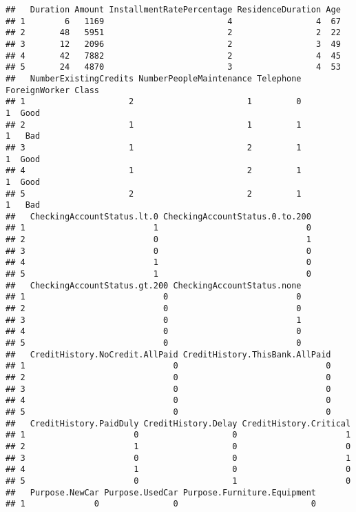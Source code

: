 \documentclass[
]{book}
\begin{document}
\begin{verbatim}
##   Duration Amount InstallmentRatePercentage ResidenceDuration Age
## 1        6   1169                         4                 4  67
## 2       48   5951                         2                 2  22
## 3       12   2096                         2                 3  49
## 4       42   7882                         2                 4  45
## 5       24   4870                         3                 4  53
##   NumberExistingCredits NumberPeopleMaintenance Telephone ForeignWorker Class
## 1                     2                       1         0             1  Good
## 2                     1                       1         1             1   Bad
## 3                     1                       2         1             1  Good
## 4                     1                       2         1             1  Good
## 5                     2                       2         1             1   Bad
##   CheckingAccountStatus.lt.0 CheckingAccountStatus.0.to.200
## 1                          1                              0
## 2                          0                              1
## 3                          0                              0
## 4                          1                              0
## 5                          1                              0
##   CheckingAccountStatus.gt.200 CheckingAccountStatus.none
## 1                            0                          0
## 2                            0                          0
## 3                            0                          1
## 4                            0                          0
## 5                            0                          0
##   CreditHistory.NoCredit.AllPaid CreditHistory.ThisBank.AllPaid
## 1                              0                              0
## 2                              0                              0
## 3                              0                              0
## 4                              0                              0
## 5                              0                              0
##   CreditHistory.PaidDuly CreditHistory.Delay CreditHistory.Critical
## 1                      0                   0                      1
## 2                      1                   0                      0
## 3                      0                   0                      1
## 4                      1                   0                      0
## 5                      0                   1                      0
##   Purpose.NewCar Purpose.UsedCar Purpose.Furniture.Equipment
## 1              0               0                           0

\end{verbatim}
\end{document}
